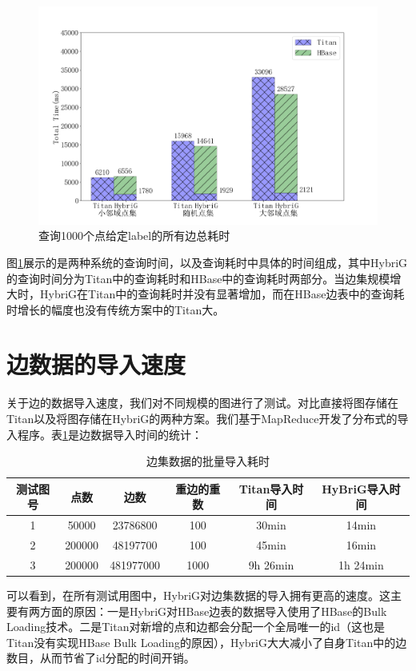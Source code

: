 \begin{figure}[htbp]
\centering
\includegraphics[width=140mm]{fig/get_edges.png}
\caption{查询1000个点给定label的所有边总耗时}
\label{fig:get_edges}
\end{figure}

图\ref{fig:get_edges}展示的是两种系统的查询时间，以及查询耗时中具体的时间组成，其中HybriG的查询时间分为Titan中的查询耗时和HBase中的查询耗时两部分。当边集规模增大时，HybriG在Titan中的查询耗时并没有显著增加，而在HBase边表中的查询耗时增长的幅度也没有传统方案中的Titan大。

\section{边数据的导入速度}
关于边的数据导入速度，我们对不同规模的图进行了测试。对比直接将图存储在Titan以及将图存储在HybriG的两种方案。我们基于MapReduce\supercite{mapreduce}开发了分布式的导入程序。表\ref{edge_load_perf}是边数据导入时间的统计：
\begin{table}[!hbp]
\begin{tabular}{|c|c|c|c|c|c|}
\hline
测试图号 & 点数 & 边数 & 重边的重数 & Titan导入时间 & HyBriG导入时间\\
\hline
1 & 50000 & 23786800 & 100 & 30min & 14min\\
\hline
2 & 200000 & 48197700 & 100 & 45min & 16min\\
\hline
3 & 200000 & 481977000 & 1000 & 9h 26min & 1h 24min\\
\hline
\end{tabular}
\caption{边集数据的批量导入耗时}
\label{edge_load_perf}
\end{table}
可以看到，在所有测试用图中，HybriG对边集数据的导入拥有更高的速度。这主要有两方面的原因：一是HybriG对HBase边表的数据导入使用了HBase的Bulk Loading技术。二是Titan对新增的点和边都会分配一个全局唯一的id（这也是Titan没有实现HBase Bulk Loading的原因），HybriG大大减小了自身Titan中的边数目，从而节省了id分配的时间开销。




